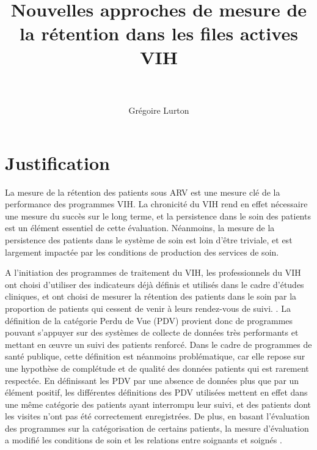 \documentclass[paper=a4, fontsize=11pt]{scrartcl}
\title{
		\usefont{OT1}{bch}{b}{n}
		\normalfont \normalsize \textsc{} \\ [25pt]
		\horrule{0.5pt} \\[0.4cm]
		\huge Nouvelles approches de mesure de la rétention dans les files actives VIH \\
		\horrule{2pt} \\[0.5cm]
}
\author{
		\normalfont 								\normalsize
        Grégoire Lurton\\[-3pt]		\normalsize
}
\date{}
\numberwithin{equation}{section}		%
\numberwithin{figure}{section}			%
\numberwithin{table}{section}				%
\begin{document}
\maketitle

\section{Justification}

La mesure de la rétention des patients sous ARV est une mesure clé de la performance des programmes VIH. La chronicité du VIH rend en effet nécessaire une mesure du succès sur le long terme, et la persistence dans le soin des patients est un élément essentiel de cette évaluation. Néanmoins, la mesure de la persistence des patients dans le système de soin est loin d'être triviale, et est largement impactée par les conditions de production des services de soin.

A l'initiation des programmes de traitement du VIH, les professionnels du VIH ont choisi d'utiliser des indicateurs déjà définis et utilisés dans le cadre d'études cliniques, et ont choisi de mesurer la rétention des patients dans le soin par la proportion de patients qui cessent de venir à leurs rendez-vous de suivi\citep{ioannidis_predictors_1999,lebouche_incidence_2006,moh_incidence_2007}.
. La définition de la catégorie Perdu de Vue (PDV) provient donc de programmes pouvant s'appuyer sur des systèmes de collecte de données très performants et mettant en \oe uvre un suivi des patients renforcé. Dans le cadre de programmes de santé publique, cette définition est néanmoins problématique, car elle repose sur une hypothèse de complétude et de qualité des données patients qui est rarement respectée. En définissant les PDV par une absence de données plus que par un élément positif, les différentes définitions des PDV utilisées  mettent en effet dans une même catégorie des patients ayant interrompu leur suivi, et des patients dont les visites n'ont pas été correctement enregistrées. De plus, en basant l'évaluation des programmes sur la catégorisation de certains patients, la mesure d'évaluation a modifié les conditions de soin et les relations entre soignants et soignés \citep{carillon_les_2011}.
\end{document}
